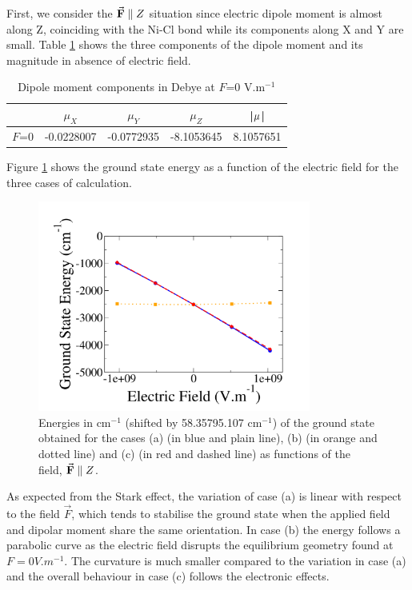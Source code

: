 \documentclass[12pt]{report}
\numberwithin{equation}{section}
\begin{document}
First, we consider the $\vec{\vb F}\parallel Z$ situation since electric dipole moment is almost along Z, coinciding with the Ni-Cl bond while its components along X and Y are small.
Table \ref{tab:DipF0Z} shows the three components of the dipole moment and its magnitude in absence of electric field.

\begin{table}[h]
    \centering
    \begin{tabular}{|c | c c c | c|}
        \hline
        & $\mu_X$ & $\mu_Y$ & $\mu_Z$ & |$\vb \mu$|\\
        \hline
        $F$=0 & -0.0228007 & -0.0772935 & -8.1053645 & 8.1057651   \\
        \hline
    \end{tabular}
    \caption{Dipole moment components in Debye at $F$=0 V.m$^{-1}$}
    \label{tab:DipF0Z}
\end{table}

Figure \ref{GSE_Z} shows the ground state energy as a function of the electric field for the three cases of calculation.

\begin{figure}[!ht]
    \centering
    \includegraphics[width=0.8\textwidth]{Images/E_Z_grand.png}
    \caption[Energies of the ground state in the three cases (a),(b) and (c) for $\vec{\vb{F}}\parallel Z$]{Energies in cm$^{-1}$ (shifted by 58.35795.107 cm$^{-1}$) of the ground state obtained for the cases (a) (in blue and plain line), (b)
	(in orange and dotted line) and (c) (in red and dashed line) as functions of the field, $\vec{\vb F}\parallel Z$.}
    \label{GSE_Z}
\end{figure}
As expected from the Stark effect, the variation of case (a) is linear with respect to the field $\vec{F}$, which tends to stabilise the ground state when the applied field and dipolar moment share the same orientation.
In case (b) the energy follows a parabolic curve as the electric field disrupts the equilibrium geometry found at $F=0 V.m^{-1}$. 
The curvature is much smaller compared to the variation in case (a) and the overall behaviour in case (c) follows the electronic effects.
\end{document}
